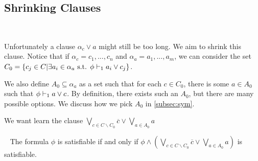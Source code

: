 \subsection{Shrinking Clauses}~\label{subsec:shrinking}

Unfortunately a clause $\alpha_c \lor a$ might still be too long. We aim to shrink this clause. Notice that if $\alpha_c = c_1, ..., c_n$ and $\alpha_a = a_1, ..., a_m$, we can consider the set $C_0 = \{c_j \in C| \exists a_i \in \alpha_a \text{ s.t. } \phi \vdash_1 a_i \lor c_j \}$.







We also define $A_0 \subseteq \alpha_a$ as a set such that for each $c \in C_0$, there is some $a \in A_0$ such that $\phi \vdash_1 a \lor c$. By definition, there exists such an $A_0$, but there are many possible options. We discuss how we pick $A_0$ in \autoref{subsec:sym}.



We want learn the clause $\bigvee_{c \in C \backslash C_0} \overline{c} \lor \bigvee_{a \in A_0} a$


\begin{theorem}~\label{thm:shrunkgbcequisat}
    The formula $\phi$ is satisfiable if and only if $\phi \land (\bigvee_{c \in C \backslash C_0} \overline{c} \lor \bigvee_{a \in A_0} a)$ is satisfiable.
\end{theorem}

